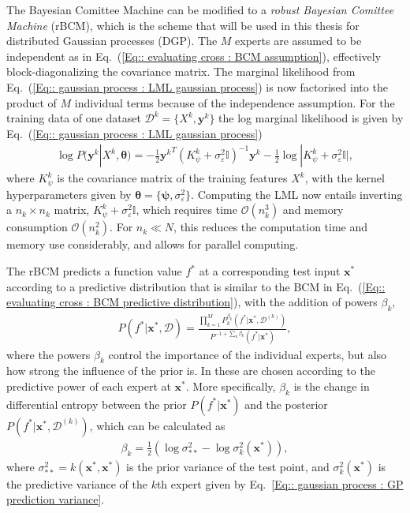 \documentclass[twoside,english]{uiofysmaster}
\begin{document}
{{The Bayesian Comittee Machine can be modified to a \textit{robust Bayesian Comittee Machine} (rBCM), which is the scheme that will be used in this thesis for distributed Gaussian processes (DGP). The $M$ experts are assumed to be independent \cite{deisenroth2015distributed} as in Eq.~(\ref{Eq:: evaluating cross : BCM assumption}), effectively block-diagonalizing the covariance matrix. The marginal likelihood from Eq.~(\ref{Eq:: gaussian process : LML gaussian process}) is now factorised into the product of $M$ individual terms because of the independence assumption. For the training data of one dataset $\mathcal{D}^k = \{X^k, \textbf{y}^k \}$ the log marginal likelihood is given by Eq.~(\ref{Eq:: gaussian process : LML gaussian process})
\begin{align}
\log P(\textbf{y}^k|X^k, \boldsymbol{\theta}) = - \frac{1}{2} {\textbf{y}^k}^T (K_{\psi}^k + \sigma_{\varepsilon}^2 \mathbb{I})^{-1}\textbf{y}^k - \frac{1}{2} \log
 |K_{\psi}^k + \sigma_{\varepsilon}^2 \mathbb{I} |,
\end{align}
where $K_{\psi}^k$ is the covariance matrix of the training features $X^k$, with the kernel hyperparameters given by $\boldsymbol{\theta} = \{ \boldsymbol{\psi}, \sigma_{\varepsilon}^2 \}$. Computing the LML now entails inverting a $n_k \times n_k$ matrix, $K_{\psi}^{k} + \sigma_{\varepsilon}^2 \mathbb{I}$, which requires time $\mathcal{O}(n_k^3)$ and memory consumption $\mathcal{O}(n_k^2)$. For $n_k \ll N$, this reduces the computation time and memory use considerably, and allows for parallel computing. 

The rBCM predicts a function value $f^*$ at a corresponding test input $\textbf{x}^*$ according to a predictive distribution that is similar to the BCM in Eq.~(\ref{Eq:: evaluating cross : BCM predictive distribution}), with the addition of powers $\beta_k$,
\begin{align}
P(f^* | \textbf{x}^*, \mathcal{D}) = \frac{\prod_{k=1}^M P_k^{\beta_k} (f^*| \textbf{x}^*, \mathcal{D}^{(k)})}{P^{-1 + \sum_k \beta_k} (f^* | \textbf{x}^*)},
\end{align}
where the powers $\beta_k$ control the importance of the individual experts, but also how strong the influence of the prior is. In \cite{deisenroth2015distributed} these are chosen according to the predictive power of each expert at $\textbf{x}^*$. More specifically, $\beta_k$ is the change in differential entropy between the prior $P(f^* | \textbf{x}^*)$ and the posterior $P(f^* | \textbf{x}^*, \mathcal{D}^{(k)})$, which can be calculated as 
\begin{align}
\beta_k = \frac{1}{2} (\log \sigma_{**}^2 - \log \sigma^2_k(\textbf{x}^*) ),
\end{align}
where $\sigma_{**}^2 = k(\textbf{x}^*, \textbf{x}^*)$ is the prior variance of the test point, and $\sigma_k^2 (\textbf{x}^*)$ is the predictive variance of the $k$th expert given by Eq.~\ref{Eq:: gaussian process : GP prediction variance}. 

}}
\end{document}
